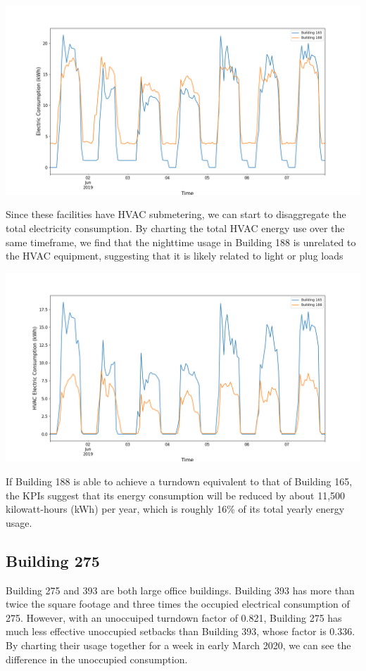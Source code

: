\documentclass[a4paper]{article}
\begin{document}
\includegraphics[width=.9\columnwidth]{./images/188v165_Turndown.png}

Since these facilities have HVAC submetering, we can start to disaggregate the total electricity consumption. By charting the total HVAC energy use over the same timeframe, we find that the nighttime usage in Building 188 is unrelated to the HVAC equipment, suggesting that it is likely related to light or plug loads

\includegraphics[width=.9\columnwidth]{./images/188v165_Turndown_HVAC.png}

If Building 188 is able to achieve a turndown equivalent to that of Building 165, the KPIs suggest that its energy consumption will be reduced by about 11,500 kilowatt-hours (kWh) per year, which is roughly 16\% of its total yearly energy usage.

\subsection{Building 275}

Building 275 and 393 are both large office buildings. Building 393 has more than twice the square footage and three times the occupied electrical consumption of 275. However, with an unoccuiped turndown factor of 0.821, Building 275 has much less effective unoccupied setbacks than Building 393, whose factor is 0.336. By charting their usage together for a week in early March 2020, we can see the difference in the unoccupied consumption.
\end{document}
